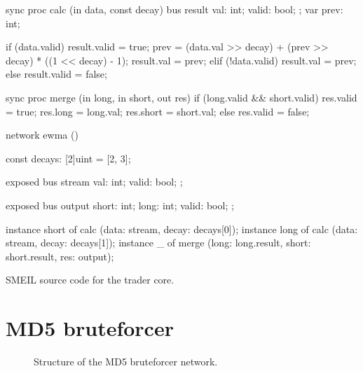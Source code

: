 \begin{widefigure}
  \begin{smeilcode2}
sync proc calc (in data, const decay)
  bus result {
    val: int;
    valid: bool;
  };
  var prev: int;

{
  if (data.valid) {
    result.valid = true;
    prev = (data.val >> decay) +
      (prev >> decay) *
      ((1 << decay) - 1);
    result.val = prev;
  } elif (!data.valid) {
    result.val = prev;
  } else {
    result.valid = false;
  }
}

sync proc merge (in long,
                 in short, out res) {
  if (long.valid && short.valid) {
    res.valid = true;
    res.long = long.val;
    res.short = short.val;
  } else {
    res.valid = false;
  }
}

network ewma () {
  const decays: [2]uint = [2, 3];

  exposed bus stream {
    val: int;
    valid: bool;
  };

  exposed bus output {
    short: int;
    long: int;
    valid: bool;
  };

  instance short of calc 
      (data: stream, decay: decays[0]);
  instance long of calc
      (data: stream, decay: decays[1]);
  instance _ of merge
      (long: long.result,
       short: short.result,
       res: output);
}
\end{smeilcode2}
\caption{SMEIL source code for the trader core.}
\label{fig:tradesrc}

\end{widefigure}

\section{MD5 bruteforcer}
\begin{figure}%
  \centering
  \caption{Structure of the MD5 bruteforcer network.}
  \label{fig:md5net}
\end{figure}


